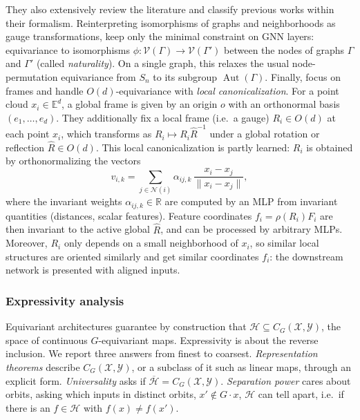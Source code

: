 \documentclass[mathematics,review,submit,moreauthors]{Definitions/mdpi}
\begin{document}
They also extensively review the literature and classify previous works within their formalism.
Reinterpreting isomorphisms of graphs and neighborhoods as gauge transformations, \citet{dehaan2020} keep only the minimal constraint on GNN layers: equivariance to isomorphisms $\phi : \mathcal{V}(\Gamma) \to \mathcal{V}(\Gamma')$ between the nodes of graphs $\Gamma$ and $\Gamma'$ (called \emph{naturality}).
On a single graph, this relaxes the usual node-permutation equivariance from $S_n$ to its subgroup $\operatorname{Aut}(\Gamma)$.
Finally, \citet{lippmann2025iclr} focus on frames and handle $O(d)$-equivariance with \emph{local canonicalization}.
For a point cloud $x_i \in \mathbb E^d$, a global frame is given by an origin $o$ with an orthonormal basis $(e_1, \dots, e_d)$.
They additionally fix a local frame (i.e.\ a gauge) $R_i\in O(d)$ at each point $x_i$, which transforms as $R_i\mapsto R_i\hat R^{-1}$ under a global rotation or reflection $\hat R \in O(d)$.
This local canonicalization is partly learned: $R_i$ is obtained by orthonormalizing the vectors
\[
    v_{i,k} = \sum_{j \in \mathcal{N}(i)} \alpha_{ij,k} \, \frac{x_i - x_j}{\lVert x_i - x_j\rVert},
\]
where the invariant weights $\alpha_{ij,k} \in \mathbb R$ are computed by an MLP from invariant quantities (distances, scalar features).
Feature coordinates $f_i = \rho(R_i)F_i$ are then invariant to the active global $\hat R$, and can be processed by arbitrary MLPs.
Moreover, $R_i$ only depends on a small neighborhood of $x_i$, so similar local structures are oriented similarly and get similar coordinates $f_i$: the downstream network is presented with aligned inputs.

\subsubsection{Expressivity analysis}
Equivariant architectures guarantee by construction that $\mathcal{H}\subseteq C_G(\mathcal{X},\mathcal{Y})$, the space of continuous $G$-equivariant maps.
Expressivity is about the reverse inclusion.
We report three answers from finest to coarsest.
\emph{Representation theorems} describe $C_G(\mathcal{X},\mathcal{Y})$, or a subclass of it such as linear maps, through an explicit form.
\emph{Universality} asks if $\overline{\mathcal{H}}=C_G(\mathcal{X},\mathcal{Y})$.
\emph{Separation power} cares about orbits, asking which inputs in distinct orbits, $x'\notin G\cdot x$, $\mathcal H$ can tell apart, i.e.\ if there is an $f \in\mathcal H$ with $f(x)\neq f(x')$.
\end{document}
